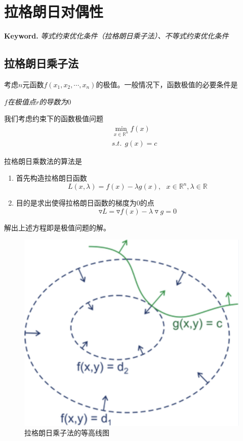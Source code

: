 \chapter{拉格朗日对偶性}

\textbf{Keyword.} \textsl{等式约束优化条件（拉格朗日乘子法）、不等式约束优化条件}

\section{拉格朗日乘子法}

考虑$n$元函数$f(x_1,x_2,\cdots,x_n)$的极值。一般情况下，函数极值的必要条件是
\begin{center}
    \textsl{$f$在极值点$r$的导数为$0$}
\end{center}

我们考虑约束下的函数极值问题
\begin{equation}
    \begin{aligned}
        & \min\limits_{x\in \mathbb{R}^n} f(x)\\
        & s.t.\ \ g(x)=c
    \end{aligned}
\end{equation}

拉格朗日乘数法的算法是
\begin{enumerate}[itemindent=2em]
    \item 首先构造拉格朗日函数
    \begin{equation}
        L(x,\lambda) = f(x)-\lambda g(x),\ \ \ x\in \mathbb{R}^n,\lambda\in \mathbb{R}
    \end{equation}
    \item 目的是求出使得拉格朗日函数的梯度为$0$的点
    \begin{equation}
        \triangledown L=\triangledown f(x)-\lambda\triangledown g=0
    \end{equation}
\end{enumerate}

解出上述方程即是极值问题的解。
\begin{figure}[H]
    \centering
    \includegraphics[scale=0.3]{figures/二元优化问题.png}
    \caption{拉格朗日乘子法的等高线图}
\end{figure}

